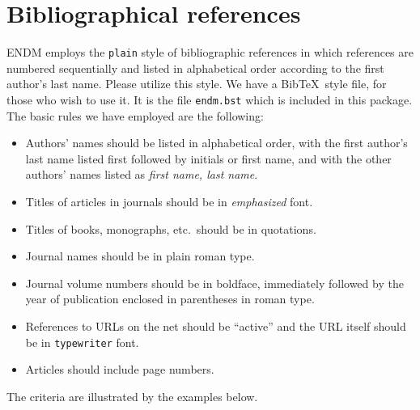 \documentclass{endm}
\begin{document}
\section{Bibliographical references}\label{references}

ENDM employs the \texttt{plain} style of bibliographic references in
which references are numbered sequentially and listed in alphabetical
order according to the first author's last name. Please utilize this
style. We have a Bib\TeX\ style file, for those who wish to use it.
It is the file \texttt{endm.bst} which is included in this package.
The basic rules we have employed are the following:
\begin{itemize}
\item Authors' names should be listed in alphabetical order, with the
first author's last name listed first followed by initials or first
name, and with the other authors' names listed as \emph{first name,
last name}.
\item Titles of articles in journals should be in \emph{emphasized}
font.
\item Titles of books, monographs, etc.\ should be in quotations.
\item Journal names should be in plain roman type.
\item Journal volume numbers should be in boldface, immediately
followed by the year of publication enclosed in parentheses in
roman type.
\item References to URLs on the net should be ``active'' and the URL
itself should be in {\tt typewriter} font.
\item Articles should include page numbers.
\end{itemize}

The criteria are illustrated by the examples below.
\end{document}
